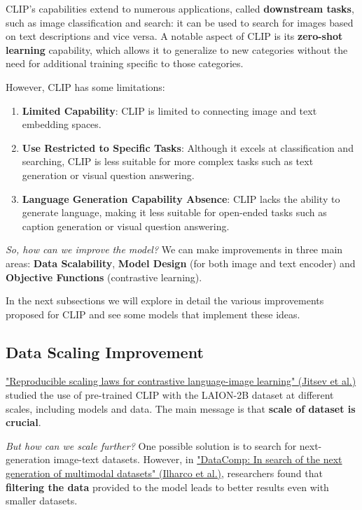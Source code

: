 CLIP's capabilities extend to numerous applications, called \textbf{downstream tasks}, such as image classification and search: it can be used to search for images based on text descriptions and vice versa. A notable aspect of CLIP is its \textbf{zero-shot learning} capability, which allows it to generalize to new categories without the need for additional training specific to those categories. 

However, CLIP has some limitations:
\begin{enumerate}
    \item \textbf{Limited Capability}: CLIP is limited to connecting image and text embedding spaces.
    \item \textbf{Use Restricted to Specific Tasks}: Although it excels at classification and searching, CLIP is less suitable for more complex tasks such as text generation or visual question answering.
    \item \textbf{Language Generation Capability Absence}: CLIP lacks the ability to generate language, making it less suitable for open-ended tasks such as caption generation or visual question answering.
\end{enumerate}

\textit{So, how can we improve the model?} We can make improvements in three main areas: \textbf{Data Scalability}, \textbf{Model Design} (for both image and text encoder) and \textbf{Objective Functions} (contrastive learning).

In the next subsections we will explore in detail the various improvements proposed for CLIP and see some models that implement these ideas.


\subsection{Data Scaling Improvement}

\href{https://arxiv.org/pdf/2212.07143}{"Reproducible scaling laws for contrastive language-image learning" (Jitsev et al.)} studied the use of pre-trained CLIP with the LAION-2B dataset at different scales, including models and data. The main message is that \textbf{scale of dataset is crucial}.

\textit{But how can we scale further?} One possible solution is to search for next-generation image-text datasets. However, in \href{https://arxiv.org/pdf/2304.14108}{"DataComp: In search of the next generation of multimodal datasets" (Ilharco et al.)}, researchers found that \textbf{filtering the data} provided to the model leads to better results even with smaller datasets.


